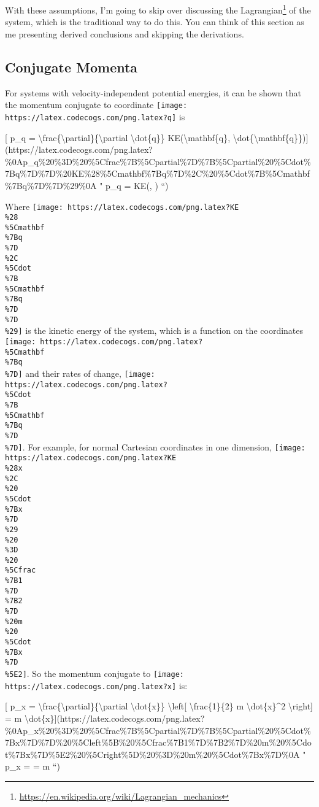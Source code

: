 \documentclass[]{article}
\renewcommand{\href}[2]{#2\footnote{\url{#1}}}
\begin{document}
With these assumptions, I'm going to skip over discussing the
\href{https://en.wikipedia.org/wiki/Lagrangian_mechanics}{Lagrangian} of the
system, which is the traditional way to do this. You can think of this section
as me presenting derived conclusions and skipping the derivations.

\subsection{Conjugate Momenta}\label{conjugate-momenta}

For systems with velocity-independent potential energies, it can be shown that
the momentum conjugate to coordinate
\texttt{[image: https://latex.codecogs.com/png.latex?q]} is

{[} p\_q =
\textbackslash{}frac\{\textbackslash{}partial\}\{\textbackslash{}partial
\textbackslash{}dot\{q\}\} KE(\textbackslash{}mathbf\{q\},
\textbackslash{}dot\{\textbackslash{}mathbf\{q\}\}){]}(https://latex.codecogs.com/png.latex?\%0Ap\_q\%20\%3D\%20\%5Cfrac\%7B\%5Cpartial\%7D\%7B\%5Cpartial\%20\%5Cdot\%7Bq\%7D\%7D\%20KE\%28\%5Cmathbf\%7Bq\%7D\%2C\%20\%5Cdot\%7B\%5Cmathbf\%7Bq\%7D\%7D\%29\%0A
" p\_q =  KE(, ) ``)

Where
\texttt{[image: https://latex.codecogs.com/png.latex?KE\\\%28\\\%5Cmathbf\\\%7Bq\\\%7D\\\%2C\\\%5Cdot\\\%7B\\\%5Cmathbf\\\%7Bq\\\%7D\\\%7D\\\%29]}
is the kinetic energy of the system, which is a function on the coordinates
\texttt{[image: https://latex.codecogs.com/png.latex?\\\%5Cmathbf\\\%7Bq\\\%7D]} and
their rates of change,
\texttt{[image: https://latex.codecogs.com/png.latex?\\\%5Cdot\\\%7B\\\%5Cmathbf\\\%7Bq\\\%7D\\\%7D]}.
For example, for normal Cartesian coordinates in one dimension,
\texttt{[image: https://latex.codecogs.com/png.latex?KE\\\%28x\\\%2C\\\%20\\\%5Cdot\\\%7Bx\\\%7D\\\%29\\\%20\\\%3D\\\%20\\\%5Cfrac\\\%7B1\\\%7D\\\%7B2\\\%7D\\\%20m\\\%20\\\%5Cdot\\\%7Bx\\\%7D\\\%5E2]}.
So the momentum conjugate to
\texttt{[image: https://latex.codecogs.com/png.latex?x]} is:

{[} p\_x =
\textbackslash{}frac\{\textbackslash{}partial\}\{\textbackslash{}partial
\textbackslash{}dot\{x\}\} \textbackslash{}left{[}
\textbackslash{}frac\{1\}\{2\} m \textbackslash{}dot\{x\}\^{}2
\textbackslash{}right{]} = m
\textbackslash{}dot\{x\}{]}(https://latex.codecogs.com/png.latex?\%0Ap\_x\%20\%3D\%20\%5Cfrac\%7B\%5Cpartial\%7D\%7B\%5Cpartial\%20\%5Cdot\%7Bx\%7D\%7D\%20\%5Cleft\%5B\%20\%5Cfrac\%7B1\%7D\%7B2\%7D\%20m\%20\%5Cdot\%7Bx\%7D\%5E2\%20\%5Cright\%5D\%20\%3D\%20m\%20\%5Cdot\%7Bx\%7D\%0A
" p\_x = 
 = m  ``)
\end{document}
